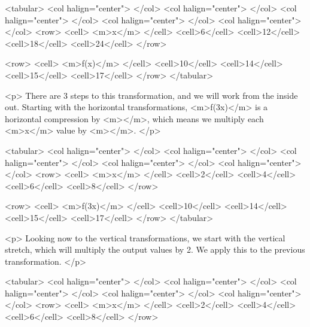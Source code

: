                 <tabular>
                    <col halign="center"> </col> <col halign="center"> </col> <col halign="center"> </col> <col halign="center"> </col> <col halign="center"> </col>
                    <row>
                        <cell> <m>x</m> </cell>
                        <cell>6</cell>
                        <cell>12</cell>
                        <cell>18</cell>
                        <cell>24</cell>
                    </row>

                    <row>
                        <cell> <m>f(x)</m> </cell>
                        <cell>10</cell>
                        <cell>14</cell>
                        <cell>15</cell>
                        <cell>17</cell>
                    </row>
                </tabular>

                <p>
                    There are 3 steps to this transformation, and we will work from the inside out.
                    Starting with the horizontal transformations, <m>f(3x)</m> is a horizontal compression by <m></m>, which means we multiply each <m>x</m> value by <m></m>.
                </p>

                <tabular>
                    <col halign="center"> </col> <col halign="center"> </col> <col halign="center"> </col> <col halign="center"> </col> <col halign="center"> </col>
                    <row>
                        <cell> <m>x</m> </cell>
                        <cell>2</cell>
                        <cell>4</cell>
                        <cell>6</cell>
                        <cell>8</cell>
                    </row>

                    <row>
                        <cell> <m>f(3x)</m> </cell>
                        <cell>10</cell>
                        <cell>14</cell>
                        <cell>15</cell>
                        <cell>17</cell>
                    </row>
                </tabular>

                <p>
                    Looking now to the vertical transformations, we start with the vertical stretch, which will multiply the output values by 2.
                    We apply this to the previous transformation.
                </p>

                <tabular>
                    <col halign="center"> </col> <col halign="center"> </col> <col halign="center"> </col> <col halign="center"> </col> <col halign="center"> </col>
                    <row>
                        <cell> <m>x</m> </cell>
                        <cell>2</cell>
                        <cell>4</cell>
                        <cell>6</cell>
                        <cell>8</cell>
                    </row>

